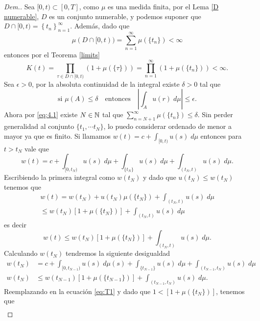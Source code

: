 \begin{proof}[Dem.]
	Sea $[0,t)\subset[0,T]$, como $\mu$ es una medida finita, por el Lema \ref{D numerable}, $D$ es un conjunto numerable, y podemos suponer que  $ D\cap[0,t)=\left\lbrace t_n\right\rbrace _{n=1}^\infty$. 
	Además, dado que  
	\begin{equation}\mu(D\cap[0,t))=\sum_{n=1}^\infty\mu(\{t_n\})<\infty\label{eq:4.1}
	\end{equation}
	entonces por el Teorema \ref{limits}
 $$K(t)=\prod_{\tau\in D\cap[0,t)}\left( 1+\mu(\{\tau\})\right)=\displaystyle\prod_{n=1}^\infty\left( 1+\mu(\{t_n\})\right) < \infty.$$
	Sea $\epsilon>0$, por la absoluta continuidad de la integral existe $\delta>0$ tal que   $$\text{si } \mu(A)\leq\delta\quad \text{entonces}\quad \left| \int_Au(r)\; d\mu\right| \leq \epsilon.$$
	 Ahora por \eqref{eq:4.1} existe $N\in\mathbb{N}$ tal que $\displaystyle\sum_{n=N+1}^{\infty}\mu(\{t_n\})\leq \delta$. Sin perder generalidad al conjunto  $\{t_1,\cdots t_N\}$, lo puedo considerar ordenado de menor a mayor ya que es finito. 
	Si llamamos $w(t)=c+\displaystyle\int_{[0,t)}u(s)\;d\mu$ entonces para $t>t_N$ vale que
	\begin{equation*}
		w(t)=c+\int_{[0,t_N)}u(s)\;d\mu+\int_{\{t_N\}}u(s)\;d\mu+\int_{(t_N,t)}u(s)\;d\mu.
	\end{equation*}
Escribiendo la primera integral como $w(t_N)$ y dado que $u(t_N)\leq w(t_N)$ tenemos que
	\begin{multline*}
	w(t)=w(t_N)+u(t_N)\mu(\{t_N\})+\int_{(t_N,t)}u(s)\;d\mu\\
	\leq w(t_N)\left[ 1+\mu(\{t_N\})\right] +\int_{(t_N,t)}u(s)\;d\mu
\end{multline*}
es decir
\begin{equation}\label{eq:T1}
	w(t)\leq  w(t_N)\left[ 1+\mu(\{t_N\})\right] +\int_{(t_N,t)}u(s)\;d\mu.
\end{equation}
Calculando $w(t_N)$  tendremos la siguiente desigualdad
\begin{equation}
\begin{split}
	w(t_N)&=c+\int_{[0,t_{N-1})}u(s)\;d\mu(s)+\int_{\{t_{N-1}\}}u(s)\;d\mu+\int_{(t_{N-1},t_N)}u(s)\;d\mu\\
	w(t_N)&\leq w(t_{N-1})\left[1+ \mu(\{t_{N-1}\})\right] +\int_{(t_{N-1},t_N)}u(s)\;d\mu.\label{eq:T2}
 \end{split}
\end{equation}
Reemplazando en la ecuación \eqref{eq:T1}  y  dado que $1<[1+\mu(\{t_N\})]$,  tenemos que
\begin{multline*}

\end{multline*}
\end{proof}
